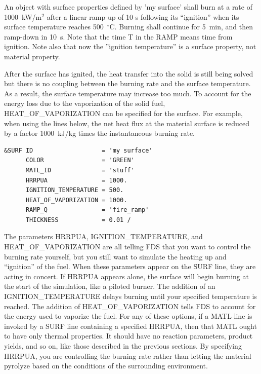 \documentclass[11pt]{book}
\begin{document}
\noindent
An object with surface properties defined by {\ct 'my surface'} shall
burn at a rate of 1000~kW/m$^2$ after a linear ramp-up of 10 s
following its ``ignition'' when its surface temperature reaches
500~$^\circ$C. Burning shall continue for 5~min, and then ramp-down
in 10~s. Note that the time {\ct T} in the {\ct RAMP} means time from
ignition. Note also that now the ''ignition temperature'' is a surface
property, not material property.

After the surface has ignited, the heat transfer into the solid is
still being solved but there is no coupling between the burning rate
and the surface temperature. As a result, the surface temperature may
increase too much. To account for the energy loss due to the
vaporization of the solid fuel, {\ct HEAT\_OF\_VAPORIZATION} can be
specified for the surface. For example, when using the lines below,
the net heat flux at the material surface is reduced by a factor
1000~kJ/kg times the instantaneous burning rate.

\footnotesize
\begin{verbatim}
&SURF ID                   = 'my surface'
      COLOR                = 'GREEN'
      MATL_ID              = 'stuff'
      HRRPUA               = 1000.
      IGNITION_TEMPERATURE = 500.
      HEAT_OF_VAPORIZATION = 1000.
      RAMP_Q               = 'fire_ramp'
      THICKNESS            = 0.01 /
\end{verbatim} \normalsize

\noindent
The parameters {\ct HRRPUA}, {\ct IGNITION\_TEMPERATURE}, and {\ct HEAT\_OF\_VAPORIZATION} are all telling FDS that you want to control the
burning rate yourself, but you still want to simulate the heating up and ``ignition'' of the fuel. When these parameters appear on the {\ct SURF} line, they
are acting in concert. If {\ct HRRPUA} appears alone, the surface will begin burning at the start of the simulation, like a piloted burner. The addition of
an {\ct IGNITION\_TEMPERATURE} delays burning until your specified temperature is reached. The addition of {\ct HEAT\_OF\_VAPORIZATION}
tells FDS to account for the energy used to vaporize the fuel. For any of these options, if a {\ct MATL} line is invoked by a {\ct SURF} line containing
a specified {\ct HRRPUA}, then that {\ct MATL} ought to have only thermal properties. It should have no reaction parameters, product yields, and so on, like
those described in the previous sections. By specifying {\ct HRRPUA}, you are controlling the burning rate rather than letting the material pyrolyze based on
the conditions of the surrounding environment.
\end{document}
